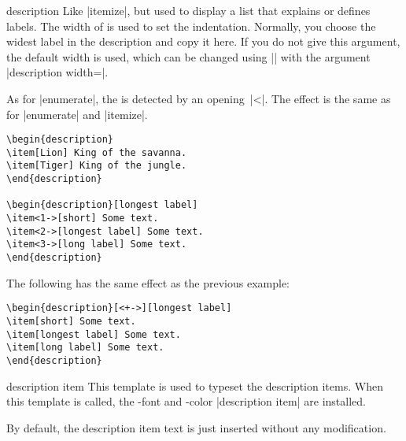\begin{environment}{{description}}
  Like |itemize|, but used to display a list that explains or defines labels. The width of  is used to set the indentation. Normally, you choose the widest label in the description and copy it here. If you do not give this argument, the default width is used, which can be changed using |\setbeamersize| with the argument |description width=|.

  As for |enumerate|, the  is detected by an opening~|<|. The effect is the same as for |enumerate| and |itemize|.
  \example
\begin{verbatim}
\begin{description}
\item[Lion] King of the savanna.
\item[Tiger] King of the jungle.
\end{description}

\begin{description}[longest label]
\item<1->[short] Some text.
\item<2->[longest label] Some text.
\item<3->[long label] Some text.
\end{description}
\end{verbatim}

  \example
  The following has the same effect as the previous example:
\begin{verbatim}
\begin{description}[<+->][longest label]
\item[short] Some text.
\item[longest label] Some text.
\item[long label] Some text.
\end{description}
\end{verbatim}

  \begin{element}{description item}\yes\yes\yes
    This template is used to typeset the description items. When this template is called, the \beamer-font and -color |description item| are installed.

    \begin{templateoptions}
      By default, the description item text is just inserted without any modification.
    \end{templateoptions}


\end{element}
\end{environment}
